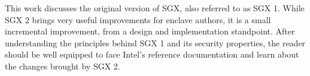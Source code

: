 This work discusses the original version of SGX, also referred to as SGX 1.
While SGX 2 brings very useful improvements for enclave authors, it is a small
incremental improvement, from a design and implementation standpoint. After
understanding the principles behind SGX 1 and its security properties, the
reader should be well equipped to face Intel's reference documentation and
learn about the changes brought by SGX 2.
